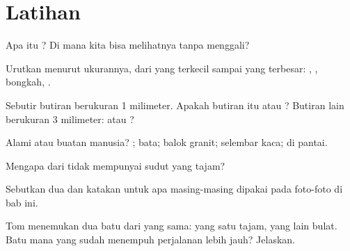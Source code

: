 \section{Latihan}

\begin{exercise}[$\star$]\label{exo:g3:stones-pebbles-sand:1}
Apa itu ? Di mana kita bisa melihatnya tanpa menggali?
\end{exercise}

\begin{exercise}[$\star$]\label{exo:g3:stones-pebbles-sand:2}
Urutkan menurut ukurannya, dari yang terkecil sampai yang terbesar:
, , bongkah, .
\end{exercise}

\begin{exercise}[$\star$]\label{exo:g3:stones-pebbles-sand:3}
Sebutir butiran berukuran 1 milimeter. Apakah butiran itu  atau
? Butiran lain berukuran 3 milimeter:  atau ?
\end{exercise}

\begin{exercise}[$\star$]\label{exo:g3:stones-pebbles-sand:4}
Alami atau buatan manusia? ; bata; balok granit; selembar kaca;
 di pantai.
\end{exercise}

\begin{exercise}[$\star$]\label{exo:g3:stones-pebbles-sand:5}
Mengapa  dari  tidak mempunyai sudut yang tajam?
\end{exercise}

\begin{exercise}[$\star$]\label{exo:g3:stones-pebbles-sand:6}
Sebutkan dua  dan katakan untuk apa masing-masing dipakai
pada foto-foto di bab ini.
\end{exercise}

\begin{exercise}[$\star\star$]\label{exo:g3:stones-pebbles-sand:7}
Tom menemukan dua batu dari  yang sama: yang satu tajam, yang lain
bulat. Batu mana yang sudah menempuh perjalanan lebih jauh? Jelaskan.
\end{exercise}


